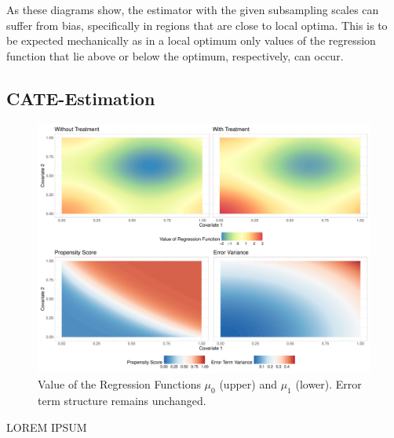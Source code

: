 As these diagrams show, the estimator with the given subsampling scales can suffer from bias, specifically in regions that are close to local optima.
This is to be expected mechanically as in a local optimum only values of the regression function that lie above or below the optimum, respectively, can occur.


\subsection{CATE-Estimation}

\begin{figure}[H]
	\centering
	\includegraphics[width = \textwidth]{../Graphics/CATE_Exmp1.pdf}
	\caption{Value of the Regression Functions $\mu_0$ (upper) and $\mu_1$ (lower).	Error term structure remains unchanged.}
	\label{fig:CATE_surfaces}
\end{figure}

{\color{red} LOREM IPSUM}